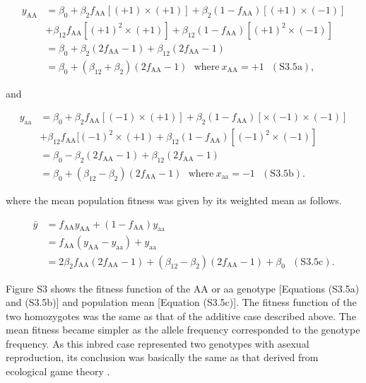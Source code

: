 \documentclass[12pt,]{article}
\begin{document}
\begin{equation*}
\begin{split}
y_\mathrm{AA} &= \beta_0 + \beta_2f_\mathrm{AA}[(+1)\times(+1)] + \beta_2(1-f_\mathrm{AA})[(+1)\times(-1)] \\
&+ \beta_{12}f_\mathrm{AA}[(+1)^2\times(+1)] + \beta_{12}(1-f_\mathrm{AA})[(+1)^2\times(-1)] \\ 
&= \beta_0 + \beta_2(2f_\mathrm{AA}-1) + \beta_{12}(2f_\mathrm{AA}-1) \\ 
&= \beta_0 + (\beta_{12}+\beta_2)(2f_\mathrm{AA}-1)~~~\mathrm{where}~x_\mathrm{AA} = +1~~~(\mathrm{S3.5a}),
\end{split}
\end{equation*}

\noindent
and

\begin{equation*}
\begin{split}
y_\mathrm{aa} &= \beta_0 + \beta_2f_\mathrm{AA}[(-1)\times(+1)] + \beta_2(1-f_\mathrm{AA})[\times(-1)\times(-1)] \\
&+ \beta_{12}f_\mathrm{AA}[(-1)^2\times(+1) + \beta_{12}(1-f_\mathrm{AA})[(-1)^2\times(-1)] \\
&= \beta_0 - \beta_2(2f_\mathrm{AA}-1) + \beta_{12}(2f_\mathrm{AA}-1) \\
&= \beta_0 + (\beta_{12}-\beta_2)(2f_\mathrm{AA}-1)~~~\mathrm{where}~x_\mathrm{aa} = -1~~~(\mathrm{S3.5b}).
\end{split}
\end{equation*}

\noindent
where the mean population fitness was given by its weighted mean as follows. 

\begin{equation*}
\begin{split}
\bar{y} &= f_\mathrm{AA}y_\mathrm{AA} + (1-f_\mathrm{AA})y_\mathrm{aa} \\
&= f_\mathrm{AA}(y_\mathrm{AA}-y_\mathrm{aa}) + y_\mathrm{aa} \\
&= 2\beta_{2}f_\mathrm{AA}(2f_\mathrm{AA}-1) + (\beta_{12}-\beta_2)(2f_\mathrm{AA}-1) + \beta_0~~~(\mathrm{S3.5c}). 
\end{split}
\end{equation*}

Figure S3 shows the fitness function of the AA or aa genotype [Equations (S3.5a) and (S3.5b)] and population mean [Equation (S3.5c)]. The fitness function of the two homozygotes was the same as that of the additive case described above. The mean fitness became simpler as the allele frequency corresponded to the genotype frequency. As this inbred case represented two genotypes with asexual reproduction, its conclusion was basically the same as that derived from ecological game theory \citep{takahashi2018balanced}. 
\end{document}
